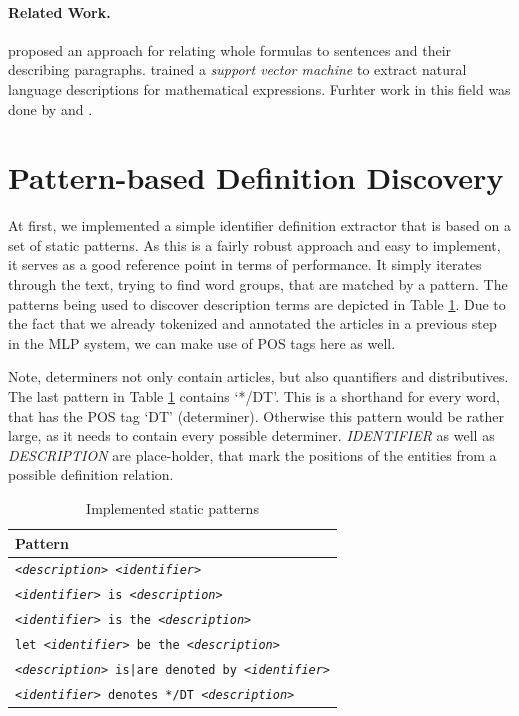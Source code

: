 \documentclass[runningheads]{llncs}
\begin{document}
\paragraph{Related Work.}

\citeauthor{Quoc2010} \cite{Quoc2010} proposed an approach for
relating whole formulas to sentences and their describing paragraphs.
\citeauthor{Yokoi} \cite{Yokoi} trained a \emph{support vector machine} to extract
natural language descriptions for mathematical expressions. Furhter work in this field was
done by \cite{ref2} and \cite{ref1}.

\section{Pattern-based Definition Discovery}

At first, we implemented a simple identifier definition extractor that is
based on a set of static patterns. As this is a fairly robust approach and easy
to implement, it serves as a good reference point in terms of
performance. It simply iterates through the text, trying to find word groups,
that are matched by a pattern. The patterns being used to discover description
terms are depicted in Table \ref{tpatterns}. Due to the fact that we already
tokenized and annotated the articles in a previous step in the MLP system, we
can make use of POS tags here as well.

Note, determiners not only contain articles, but also quantifiers and
distributives. The last pattern in Table \ref{tpatterns} contains `*/DT'. This
is a shorthand for every word, that has the POS tag `DT' (determiner).
Otherwise this pattern would be rather large, as it needs to contain every
possible determiner. \emph{IDENTIFIER} as well as \emph{DESCRIPTION} are
place-holder, that mark the positions of the entities from a possible definition
relation.

\begin{table}
\vspace{-5pt}
	\begin{center}
		\begin{tabular}{| p{9.3cm} |}
			\hline
			Pattern \\
			\hline
			\texttt{\emph{<description>} \emph{<identifier>}} \\
			\texttt{\emph{<identifier>} is \emph{<description>}} \\
			\texttt{\emph{<identifier>} is the \emph{<description>}} \\
			\texttt{let \emph{<identifier>} be the \emph{<description>}} \\
			\texttt{\emph{<description>} is|are denoted by \emph{<identifier>}} \\
			\texttt{\emph{<identifier>} denotes */DT \emph{<description>}} \\
			\hline
		\end{tabular}
	\end{center}
\caption{\label{tpatterns}Implemented static patterns}
\vspace{-5pt}
\end{table}
\end{document}
